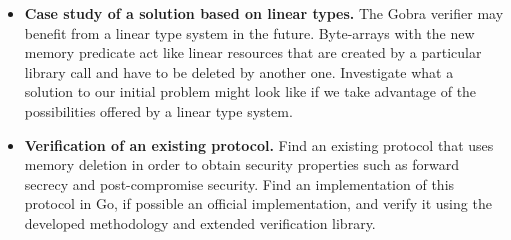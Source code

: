 \documentclass{article}
\begin{document}
\begin{itemize}
      \item \textbf{Case study of a solution based on linear types.} The Gobra verifier may benefit from a linear type system in the future. Byte-arrays with the new memory predicate act like linear resources that are created by a particular library call and have to be deleted by another one. Investigate what a solution to our initial problem might look like if we take advantage of the possibilities offered by a linear type system.
      \item \textbf{Verification of an existing protocol.} Find an existing protocol that uses memory deletion in order to obtain security properties such as forward secrecy and post-compromise security. Find an implementation of this protocol in Go, if possible an official implementation, and verify it using the developed methodology and extended verification library.
\end{itemize}





\end{document}

